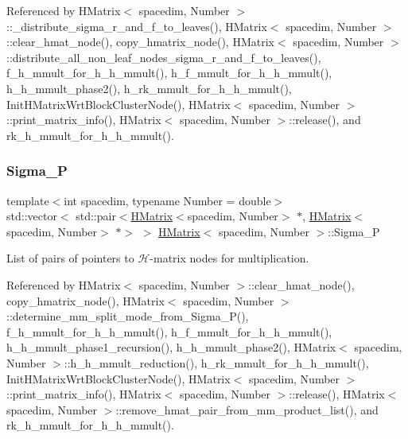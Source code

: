 Referenced by H\+Matrix$<$ spacedim, Number $>$\+::\+\_\+distribute\+\_\+sigma\+\_\+r\+\_\+and\+\_\+f\+\_\+to\+\_\+leaves(), H\+Matrix$<$ spacedim, Number $>$\+::clear\+\_\+hmat\+\_\+node(), copy\+\_\+hmatrix\+\_\+node(), H\+Matrix$<$ spacedim, Number $>$\+::distribute\+\_\+all\+\_\+non\+\_\+leaf\+\_\+nodes\+\_\+sigma\+\_\+r\+\_\+and\+\_\+f\+\_\+to\+\_\+leaves(), f\+\_\+h\+\_\+mmult\+\_\+for\+\_\+h\+\_\+h\+\_\+mmult(), h\+\_\+f\+\_\+mmult\+\_\+for\+\_\+h\+\_\+h\+\_\+mmult(), h\+\_\+h\+\_\+mmult\+\_\+phase2(), h\+\_\+rk\+\_\+mmult\+\_\+for\+\_\+h\+\_\+h\+\_\+mmult(), Init\+H\+Matrix\+Wrt\+Block\+Cluster\+Node(), H\+Matrix$<$ spacedim, Number $>$\+::print\+\_\+matrix\+\_\+info(), H\+Matrix$<$ spacedim, Number $>$\+::release(), and rk\+\_\+h\+\_\+mmult\+\_\+for\+\_\+h\+\_\+h\+\_\+mmult().

\mbox{\label{classHMatrix_a3d96d0252ef8c873ae06cf87874acaf3}} 
\subsubsection{\texorpdfstring{Sigma\+\_\+P}{Sigma\_P}}
{\footnotesize\ttfamily template$<$int spacedim, typename Number = double$>$ \\
std\+::vector$<$ std\+::pair$<$\hyperlink{classHMatrix}{H\+Matrix}$<$spacedim, Number$>$ $\ast$, \hyperlink{classHMatrix}{H\+Matrix}$<$spacedim, Number$>$ $\ast$$>$ $>$ \hyperlink{classHMatrix}{H\+Matrix}$<$ spacedim, Number $>$\+::Sigma\+\_\+P\hspace{0.3cm}{\ttfamily [private]}}

List of pairs of pointers to $\mathcal{H}$-\/matrix nodes for multiplication. 

Referenced by H\+Matrix$<$ spacedim, Number $>$\+::clear\+\_\+hmat\+\_\+node(), copy\+\_\+hmatrix\+\_\+node(), H\+Matrix$<$ spacedim, Number $>$\+::determine\+\_\+mm\+\_\+split\+\_\+mode\+\_\+from\+\_\+\+Sigma\+\_\+\+P(), f\+\_\+h\+\_\+mmult\+\_\+for\+\_\+h\+\_\+h\+\_\+mmult(), h\+\_\+f\+\_\+mmult\+\_\+for\+\_\+h\+\_\+h\+\_\+mmult(), h\+\_\+h\+\_\+mmult\+\_\+phase1\+\_\+recursion(), h\+\_\+h\+\_\+mmult\+\_\+phase2(), H\+Matrix$<$ spacedim, Number $>$\+::h\+\_\+h\+\_\+mmult\+\_\+reduction(), h\+\_\+rk\+\_\+mmult\+\_\+for\+\_\+h\+\_\+h\+\_\+mmult(), Init\+H\+Matrix\+Wrt\+Block\+Cluster\+Node(), H\+Matrix$<$ spacedim, Number $>$\+::print\+\_\+matrix\+\_\+info(), H\+Matrix$<$ spacedim, Number $>$\+::release(), H\+Matrix$<$ spacedim, Number $>$\+::remove\+\_\+hmat\+\_\+pair\+\_\+from\+\_\+mm\+\_\+product\+\_\+list(), and rk\+\_\+h\+\_\+mmult\+\_\+for\+\_\+h\+\_\+h\+\_\+mmult().

